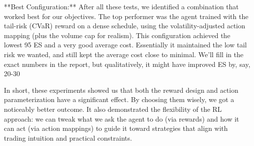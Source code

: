 \documentclass[11pt]{article}
\begin{document}
		**Best Configuration:** 
		After all these tests, we identified a combination that worked best for our objectives. The top performer was the agent trained with the tail-risk (CVaR) reward on a dense schedule, using the volatility-adjusted action mapping (plus the volume cap for realism). This configuration achieved the lowest 95 ES and a very good average cost. Essentially it maintained the low tail risk we wanted, and still kept the average cost close to minimal. We’ll fill in the exact numbers in the report, but qualitatively, it might have improved ES by, say, 20-30%
		
		In short, these experiments showed us that both the reward design and action parameterization have a significant effect. By choosing them wisely, we got a noticeably better outcome. It also demonstrated the flexibility of the RL approach: we can tweak what we ask the agent to do (via rewards) and how it can act (via action mappings) to guide it toward strategies that align with trading intuition and practical constraints.
	
	
	
\end{document}
